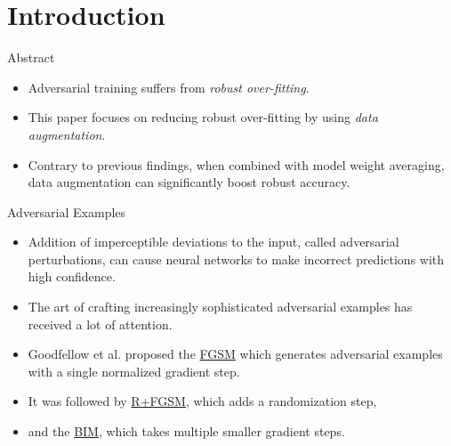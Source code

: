 \section{Introduction}

\begin{frame}{Abstract}
    \begin{itemize}
        \item Adversarial training suffers from \emph{robust over-fitting}.
        \item This paper focuses on reducing robust over-fitting by using \emph{data augmentation}.
        \item Contrary to previous findings, when combined with model weight averaging, data augmentation can significantly boost robust accuracy. 
    \end{itemize}
\end{frame}

\begin{frame}{Adversarial Examples}
    \begin{itemize}[<+-| alert@+>] %
        \item Addition of imperceptible deviations to the input, called adversarial perturbations, can cause neural networks to make incorrect predictions with high confidence.
        \item The art of crafting increasingly sophisticated adversarial examples has received a lot of attention.
        \item Goodfellow et al. proposed the \href{https://arxiv.org/abs/1412.6572}{FGSM} which generates adversarial examples with a single normalized gradient step. 
        \item It was followed by \href{https://arxiv.org/pdf/1705.07204}{R+FGSM}, which adds a randomization step,
        \item and the \href{https://arxiv.org/abs/1607.02533}{BIM}, which takes multiple smaller gradient steps.
    \end{itemize}
\end{frame}

